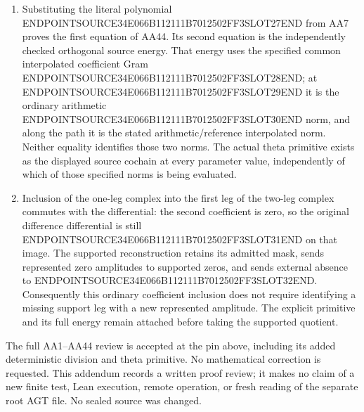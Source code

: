 \begin{enumerate}
  ENDPOINTSOURCE34E066B112111B7012502FF3SLOT21END

  AA41 turns this sum into ENDPOINTSOURCE34E066B112111B7012502FF3SLOT22END, which is the unchanged ENDPOINTSOURCE34E066B112111B7012502FF3SLOT23END. This proves AA43 with every tensor sign and the original theta factor retained. For ENDPOINTSOURCE34E066B112111B7012502FF3SLOT24END, the same division gives ENDPOINTSOURCE34E066B112111B7012502FF3SLOT25END because the cyclic annihilator is the original monic ENDPOINTSOURCE34E066B112111B7012502FF3SLOT26END, and the formula reduces to the one-leg identity without any tensor sign.
\item
  Substituting the literal polynomial ENDPOINTSOURCE34E066B112111B7012502FF3SLOT27END from AA7 proves the first equation of AA44. Its second equation is the independently checked orthogonal source energy. That energy uses the specified common interpolated coefficient Gram ENDPOINTSOURCE34E066B112111B7012502FF3SLOT28END; at ENDPOINTSOURCE34E066B112111B7012502FF3SLOT29END it is the ordinary arithmetic ENDPOINTSOURCE34E066B112111B7012502FF3SLOT30END norm, and along the path it is the stated arithmetic/reference interpolated norm. Neither equality identifies those two norms. The actual theta primitive exists as the displayed source cochain at every parameter value, independently of which of those specified norms is being evaluated.
\item
  Inclusion of the one-leg complex into the first leg of the two-leg complex commutes with the differential: the second coefficient is zero, so the original difference differential is still ENDPOINTSOURCE34E066B112111B7012502FF3SLOT31END on that image. The supported reconstruction retains its admitted mask, sends represented zero amplitudes to supported zeros, and sends external absence to ENDPOINTSOURCE34E066B112111B7012502FF3SLOT32END. Consequently this ordinary coefficient inclusion does not require identifying a missing support leg with a new represented amplitude. The explicit primitive and its full energy remain attached before taking the supported quotient.
\end{enumerate}

The full AA1--AA44 review is accepted at the pin above, including its added deterministic division and theta primitive. No mathematical correction is requested. This addendum records a written proof review; it makes no claim of a new finite test, Lean execution, remote operation, or fresh reading of the separate root AGT file. No sealed source was changed.
